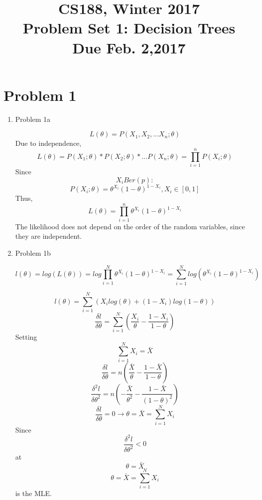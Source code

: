 \documentclass[11pt]{article}
\newcommand{\cnum}{CS188}
\newcommand{\ced}{Winter 2017}
\newcommand{\ctitle}[3]{\title{\vspace{-0.5in}\cnum, \ced\\Problem Set #1: #2\\Due #3}}
\newcommand{\solution}[1]{{{\color{blue}{\bf Solution:} {#1}}}}
\begin{document}
\ctitle{1}{Decision Trees}{Feb. 2,2017}
\author{}
\date{}
\maketitle
\vspace{-0.75in}

\section{Problem 1}
\begin{enumerate}
\item Problem 1a

\solution{
\[L(\theta) = P(X_1,X_2, ...X_n ; \theta) \]
Due to independence,
\[
L(\theta) = P(X_{1}; \theta) * P(X_{2}; \theta) * ... P(X_{n} ; \theta) = \prod_{i = 1}^{n} P(X_{i}; \theta)
\]
Since \[X_i  Ber(p): \]
\[P(X_i ; \theta) = \theta^{X_i}(1 - \theta)^{1 - X_i}, X_i \in [0,1] \]
Thus,
\[ L(\theta) = \prod_{i=1}^{n} \theta^{X_i}(1 - \theta)^{1 - X_i} \]
The likelihood does not depend on the order of the random variables, since they are independent. 
}

\vspace{1cm}
\item Problem 1b

\solution{
\[l(\theta) = log(L(\theta)) = log \prod_{i = 1}^{N} \theta^{X_i}(1 - \theta)^{1 - X_i} = \sum_{i = 1}^{N} log(\theta^{X_i}(1 - \theta)^{1 - X_i})\]

\[ l(\theta) = \sum_{i = 1}^{N}(X_{i}log(\theta) + (1 - X_{i})log(1 - \theta)) \]
\[ \frac{\delta l}{\delta \theta} = \sum_{i = 1}^{N}(\frac{X_i}{\theta} - \frac{1 - X_i}{1 - \theta}) \]
Setting \[ \sum_{i = 1}^{N} X_i = \bar{X} \]
\[ \frac{\delta l}{\delta \theta} = n(\frac{\bar{X}}{\theta} - \frac{1 - \bar{X}}{1 - \theta}) \]
\[ \frac{\delta^{2}l}{\delta \theta^{2}} = n(-\frac{\bar{X}}{\theta^{2}} - \frac{1 - \bar{X}}{(1 - \theta)^{2}}) \]
\[ \frac{\delta l}{\delta \theta} = 0 \longrightarrow{} \theta = \bar{X} = \sum_{i = 1}^{N} X_i \]
Since \[ \frac{\delta^2 l}{\delta \theta^2} < 0 \] at \[ \theta = \bar{X} \] \[ \theta = \bar{X} = \sum_{i = 1}^{N} X_i \] is the MLE.

}


\end{enumerate}
\end{document}
